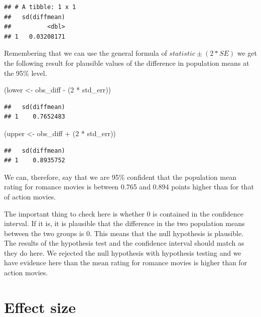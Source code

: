 \documentclass[]{tufte-book}
\newenvironment{Shaded}{\begin{snugshade}}{\end{snugshade}}
\newcommand{\DecValTok}[1]{\textcolor[rgb]{0.00,0.00,0.81}{{#1}}}
\newcommand{\StringTok}[1]{\textcolor[rgb]{0.31,0.60,0.02}{{#1}}}
\newcommand{\NormalTok}[1]{{#1}}
\begin{document}
\begin{verbatim}
## # A tibble: 1 x 1
##   sd(diffmean)
##          <dbl>
## 1   0.03208171
\end{verbatim}

Remembering that we can use the general formula of
\(statistic \pm (2 * SE)\) we get the following result for plausible
values of the difference in population means at the 95\% level.

\begin{Shaded}
\begin{Highlighting}[]
\NormalTok{(lower <-}\StringTok{ }\NormalTok{obs_diff -}\StringTok{ }\NormalTok{(}\DecValTok{2} \NormalTok{*}\StringTok{ }\NormalTok{std_err))}
\end{Highlighting}
\end{Shaded}

\begin{verbatim}
##   sd(diffmean)
## 1    0.7652483
\end{verbatim}

\begin{Shaded}
\begin{Highlighting}[]
\NormalTok{(upper <-}\StringTok{ }\NormalTok{obs_diff +}\StringTok{ }\NormalTok{(}\DecValTok{2} \NormalTok{*}\StringTok{ }\NormalTok{std_err))}
\end{Highlighting}
\end{Shaded}

\begin{verbatim}
##   sd(diffmean)
## 1    0.8935752
\end{verbatim}

We can, therefore, say that we are 95\% confident that the population
mean rating for romance movies is between 0.765 and 0.894 points higher
than for that of action movies.

The important thing to check here is whether 0 is contained in the
confidence interval. If it is, it is plausible that the difference in
the two population means between the two groups is 0. This means that
the null hypothesis is plausible. The results of the hypothesis test and
the confidence interval should match as they do here. We rejected the
null hypothesis with hypothesis testing and we have evidence here than
the mean rating for romance movies is higher than for action movies.

\section{Effect size}\label{effect-size}
\end{document}
